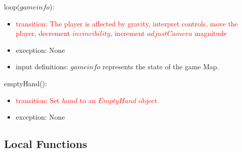 \documentclass[12pt]{article}
\begin{document}
\noindent loop($gameinfo$):
\begin{itemize}
    \item \textcolor{red}{transition: The player is affected by gravity, interpret controls, move the player, decrement $invincibility$, increment $adjustCamera$ magnitude}
    \item exception: None
    \item input definitions: $gameinfo$ represents the state of the game Map.
\end{itemize}

\noindent emptyHand():
\begin{itemize}
    \item \textcolor{red}{transition: Set $hand$ to an $EmptyHand$ object}
    \item exception: None
\end{itemize}


\subsection*{Local Functions}

\end{document}
